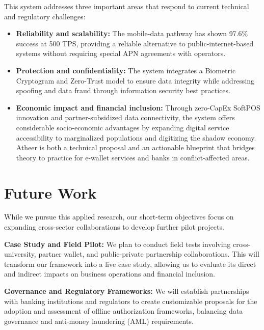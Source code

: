 \documentclass[conference,10pt]{IEEEtran}
\begin{document}
This system addresses three important areas that respond to current technical and regulatory challenges:

\begin{itemize}
\item \textbf{Reliability and scalability:} The mobile-data pathway has shown 97.6\% success at 500 TPS, providing a reliable alternative to public-internet-based systems without requiring special APN agreements with operators.

\item \textbf{Protection and confidentiality:} The system integrates a Biometric Cryptogram and Zero-Trust model to ensure data integrity while addressing spoofing and data fraud through information security best practices.

\item \textbf{Economic impact and financial inclusion:} Through zero-CapEx SoftPOS innovation and partner-subsidized data connectivity, the system offers considerable socio-economic advantages by expanding digital service accessibility to marginalized populations and digitizing the shadow economy. Atheer is both a technical proposal and an actionable blueprint that bridges theory to practice for e-wallet services and banks in conflict-affected areas.
\end{itemize}

\section{Future Work}

While we pursue this applied research, our short-term objectives focus on expanding cross-sector collaborations to develop further pilot projects.

\textbf{Case Study and Field Pilot:} We plan to conduct field tests involving cross-university, partner wallet, and public-private partnership collaborations. This will transform our framework into a live case study, allowing us to evaluate its direct and indirect impacts on business operations and financial inclusion.

\textbf{Governance and Regulatory Frameworks:} We will establish partnerships with banking institutions and regulators to create customizable proposals for the adoption and assessment of offline authorization frameworks, balancing data governance and anti-money laundering (AML) requirements.
\end{document}
